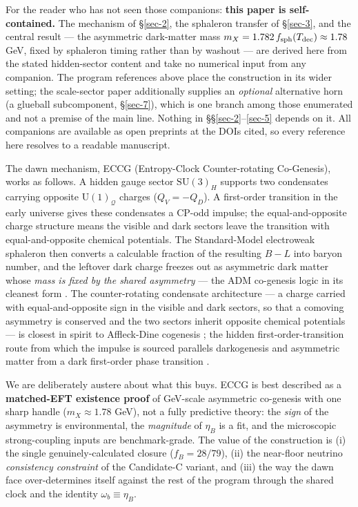 \documentclass[aps,prd,preprint,nofootinbib,superscriptaddress]{revtex4-2}
\begin{document}
For the reader who has not seen those companions: \textbf{this paper is
self-contained.} The mechanism of §\ref{sec-2}, the sphaleron transfer
of §\ref{sec-3}, and the central result --- the asymmetric dark-matter
mass \(m_X = 1.782\,f_{\rm sph}(T_{\rm dec}) \approx 1.78\) GeV, fixed
by sphaleron timing rather than by washout --- are derived here from the
stated hidden-sector content and take no numerical input from any
companion. The program references above place the construction in its
wider setting; the scale-sector paper additionally supplies an
\emph{optional} alternative horn (a glueball subcomponent,
§\ref{sec-7}), which is one branch among those enumerated and not a
premise of the main line. Nothing in §§\ref{sec-2}--\ref{sec-5} depends
on it. All companions are available as open preprints at the DOIs cited,
so every reference here resolves to a readable manuscript.

The dawn mechanism, ECCG (Entropy-Clock Counter-rotating Co-Genesis),
works as follows. A hidden gauge sector \(\mathrm{SU}(3)_H\) supports
two condensates carrying opposite \(\mathrm{U}(1)_{\mathcal{Q}}\)
charges (\(Q_V = -Q_D\)). A first-order transition in the early universe
gives these condensates a CP-odd impulse; the equal-and-opposite charge
structure means the visible and dark sectors leave the transition with
equal-and-opposite chemical potentials. The Standard-Model electroweak
sphaleron then converts a calculable fraction of the resulting \(B{-}L\)
into baryon number, and the leftover dark charge freezes out as
asymmetric dark matter whose \emph{mass is fixed by the shared
asymmetry} --- the ADM co-genesis logic in its cleanest form
\citep{March-Russell:2011ang, Cheung:2013dca}. The counter-rotating
condensate architecture --- a charge carried with equal-and-opposite
sign in the visible and dark sectors, so that a comoving asymmetry is
conserved and the two sectors inherit opposite chemical potentials ---
is closest in spirit to Affleck-Dine cogenesis \citep{Cheung:2011if};
the hidden first-order-transition route from which the impulse is
sourced parallels darkogenesis \citep{Shelton:2010ta} and asymmetric
matter from a dark first-order phase transition \citep{Hall:2019rld}.

We are deliberately austere about what this buys. ECCG is best described
as a \textbf{matched-EFT existence proof} of GeV-scale asymmetric
co-genesis with one sharp handle (\(m_X \approx 1.78\) GeV), not a fully
predictive theory: the \emph{sign} of the asymmetry is environmental,
the \emph{magnitude} of \(\eta_B\) is a fit, and the microscopic
strong-coupling inputs are benchmark-grade. The value of the
construction is (i) the single genuinely-calculated closure
(\(f_B = 28/79\)), (ii) the near-floor neutrino \emph{consistency
constraint} of the Candidate-C variant, and (iii) the way the dawn face
over-determines itself against the rest of the program through the
shared clock and the identity \(\omega_b \equiv \eta_B\).
\end{document}
